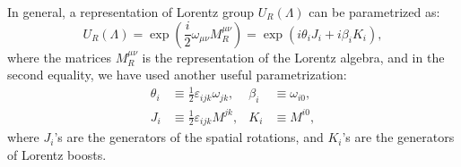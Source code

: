 \documentclass[aps,prb,superscriptaddress,nofootinbib]{revtex4}
\begin{document}
In general, a representation of Lorentz group $U_R(\Lambda)$ can be parametrized as:
\begin{equation}
	U_R(\Lambda) = \exp\left(\frac{i}{2}\omega_{\mu\nu}M_R^{\mu\nu}\right)
	= \exp\left(i \theta_i J_i +i\beta_i K_i\right),
\end{equation}
where the matrices $M_R^{\mu\nu}$ is the representation of the Lorentz algebra, and in the second equality, we have used another useful parametrization:
\begin{equation}
\begin{aligned}
	\theta_i &\equiv \frac{1}{2}\varepsilon_{ijk}\omega_{jk}, & 
	\beta_i &\equiv \omega_{i0}, \\
	J_i &\equiv \frac{1}{2}\varepsilon_{ijk}M^{jk}, & 
	K_i &\equiv M^{i0},
\end{aligned}
\end{equation}
where $J_i$'s are the generators of the spatial rotations, and $K_i$'s are the generators of Lorentz boosts.
\end{document}
